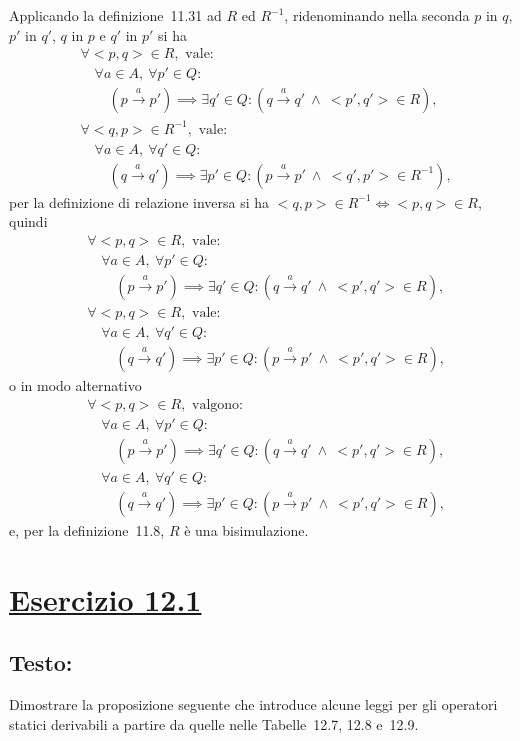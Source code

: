 \documentclass[a4paper,twosides]{report}
\newcommand{\sectionline}{
  \begin{center}
    \resizebox{0.5\linewidth}{5ex}{
      \hyperref[toc]{
        \begin{tikzpicture}
          \node  (C) at (0,0) {};
          \node (D) at (10,0) {};
          \path (C) to [ornament=84] (D);
        \end{tikzpicture}
      }
    }
  \end{center}
}
\begin{document}
Applicando la definizione~11.31 ad $R$ ed $R^{-1}$, ridenominando
nella seconda $p$
in $q$, $p'$ in $q'$, $q$ in $p$ e $q'$ in $p'$ si ha
\begin{align*}
&\forall <p,q>\in R,\text{ vale:}\\
&\quad\forall a\in A,\ \forall p'\in Q:\\
&\quad\quad(p\xrightarrow{a} p')\implies\exists q'\in Q:(q\xrightarrow{a} q'\
\land\ <p',q'>\in R),
\\
&\forall <q,p>\in R^{-1},\text{ vale:}\\
&\quad\forall a\in A,\ \forall q'\in Q:\\
&\quad\quad(q\xrightarrow{a} q')\implies\exists p'\in Q:(p\xrightarrow{a} p'\
\land\ <q',p'>\in R^{-1}),
\end{align*}
per la definizione di relazione inversa si ha
$<q,p>\in R^{-1}\iff<p,q>\in R$, quindi
\begin{align*}
&\forall <p,q>\in R,\text{ vale:}\\
&\quad\forall a\in A,\ \forall p'\in Q:\\
&\quad\quad(p\xrightarrow{a} p')\implies\exists q'\in Q:(q\xrightarrow{a} q'\
\land\ <p',q'>\in R),
\\
&\forall <p,q>\in R,\text{ vale:}\\
&\quad\forall a\in A,\ \forall q'\in Q:\\
&\quad\quad(q\xrightarrow{a} q')\implies\exists p'\in Q:(p\xrightarrow{a} p'\
\land\ <p',q'>\in R),
\end{align*}
o in modo alternativo
\begin{align*}
&\forall <p,q>\in R,\text{ valgono:}\\
&\quad\forall a\in A,\ \forall p'\in Q:\\
&\quad\quad(p\xrightarrow{a} p')\implies\exists q'\in Q:(q\xrightarrow{a} q'\
\land\ <p',q'>\in R),
\\
&\quad\forall a\in A,\ \forall q'\in Q:\\
&\quad\quad(q\xrightarrow{a} q')\implies\exists p'\in Q:(p\xrightarrow{a} p'\
\land\ <p',q'>\in R),
\end{align*}
e, per la definizione~11.8, $R$ \`e una bisimulazione.

\sectionline
\section*{\hyperref[toc]{Esercizio 12.1}}
\subsection*{Testo:}
Dimostrare la proposizione seguente che introduce alcune leggi per gli
operatori statici derivabili 
a partire da quelle nelle Tabelle~12.7, 12.8 e~12.9.
\end{document}
